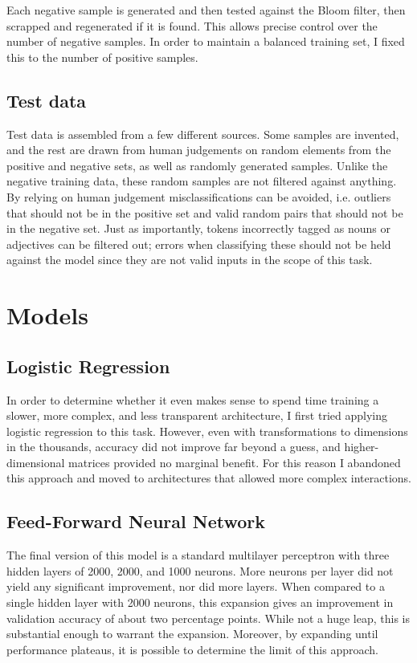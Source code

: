\documentclass[a4paper, 11pt]{scrartcl}
\begin{document}
Each negative sample is generated and then tested against the Bloom filter, then scrapped and regenerated if it is found. This allows precise control over the number of negative samples. In order to maintain a balanced training set, I fixed this to the number of positive samples.

\subsection{Test data}

Test data is assembled from a few different sources. Some samples are invented, and the rest are drawn from human judgements on random elements from the positive and negative sets, as well as randomly generated samples. Unlike the negative training data, these random samples are not filtered against anything. By relying on human judgement misclassifications can be avoided, i.e. outliers that should not be in the positive set and valid random pairs that should not be in the negative set. Just as importantly, tokens incorrectly tagged as nouns or adjectives can be filtered out; errors when classifying these should not be held against the model since they are not valid inputs in the scope of this task.


\section{Models}

\subsection{Logistic Regression}
In order to determine whether it even makes sense to spend time training a slower, more complex, and less transparent architecture, I first tried applying logistic regression to this task. However, even with transformations to dimensions in the thousands, accuracy did not improve far beyond a guess, and higher-dimensional matrices provided no marginal benefit. For this reason I abandoned this approach and moved to architectures that allowed more complex interactions.

\subsection{Feed-Forward Neural Network}
The final version of this model is a standard multilayer perceptron with three hidden layers of 2000, 2000, and 1000 neurons. More neurons per layer did not yield any significant improvement, nor did more layers. When compared to a single hidden layer with 2000 neurons, this expansion gives an improvement in validation accuracy of about two percentage points. While not a huge leap, this is substantial enough to warrant the expansion. Moreover, by expanding until performance plateaus, it is possible to determine the limit of this approach.
\end{document}
